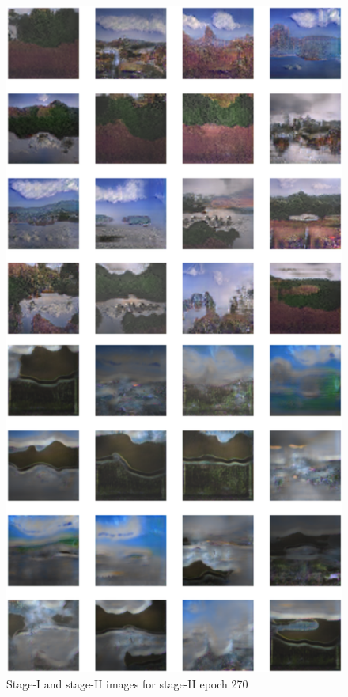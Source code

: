 \documentclass{article}
\begin{document}
	\begin{figure}[h]
	\centering
	\includegraphics[scale=0.6]{images/epoch270_FID413.png}
	\caption{Stage-I and stage-II images for stage-II epoch 270}
	\end{figure}
\end{document}
